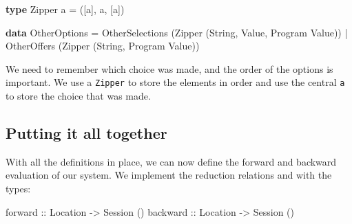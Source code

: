\documentclass[runningheads,plain]{llncs}
\providecommand{\tightlist}{%
  \setlength{\itemsep}{0pt}\setlength{\parskip}{0pt}}
\newenvironment{Shaded}{}{}
\newcommand{\KeywordTok}[1]{\textcolor[rgb]{0.00,0.44,0.13}{\textbf{#1}}}
\newcommand{\DataTypeTok}[1]{\textcolor[rgb]{0.56,0.13,0.00}{#1}}
\newcommand{\OtherTok}[1]{\textcolor[rgb]{0.00,0.44,0.13}{#1}}
\newcommand{\FunctionTok}[1]{\textcolor[rgb]{0.02,0.16,0.49}{#1}}
\newcommand{\NormalTok}[1]{#1}
\begin{document}
\begin{enumerate}[1.]
\begin{Shaded}
\begin{Highlighting}[]
\KeywordTok{type} \DataTypeTok{Zipper}\NormalTok{ a }\FunctionTok{=}\NormalTok{ (}\NormalTok{[a], a, [a])}

\KeywordTok{data} \DataTypeTok{OtherOptions}
    \FunctionTok{=} \DataTypeTok{OtherSelections}\NormalTok{ (}\DataTypeTok{Zipper}\NormalTok{ (}\DataTypeTok{String}\NormalTok{, }\DataTypeTok{Value}\NormalTok{, }\DataTypeTok{Program} \DataTypeTok{Value}\NormalTok{))}
    \FunctionTok{|} \DataTypeTok{OtherOffers}\NormalTok{ (}\DataTypeTok{Zipper}\NormalTok{ (}\DataTypeTok{String}\NormalTok{, }\DataTypeTok{Program} \DataTypeTok{Value}\NormalTok{))}
\end{Highlighting}
\end{Shaded}

  We need to remember
  which choice was made, and the order of the options is important. We
  use a \texttt{Zipper} to store the elements in order and use the
  central \texttt{a} to store the choice that was made.
\end{enumerate}






\subsection{Putting it all together}\label{combining}
With all the definitions in place, we can now define the forward and backward
evaluation of our system. We implement the reduction relations \fw and \bk with the types:
\begin{Shaded}
\begin{Highlighting}[]
\OtherTok{forward  ::} \DataTypeTok{Location} \OtherTok{->} \DataTypeTok{Session}\NormalTok{ ()}
\OtherTok{backward ::} \DataTypeTok{Location} \OtherTok{->} \DataTypeTok{Session}\NormalTok{ ()}
\end{Highlighting}
\end{Shaded}
\end{document}
